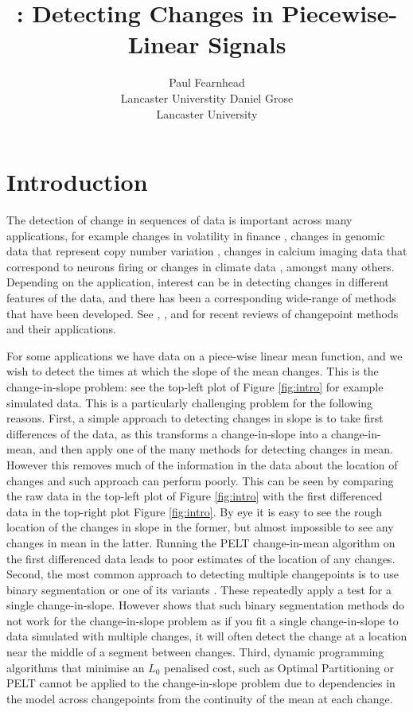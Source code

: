 \documentclass[article]{jss}
\author{Paul Fearnhead\\Lancaster Universtity \And 
        Daniel Grose\\Lancaster University}
\title{\pkg{cpop}: Detecting Changes in Piecewise-Linear Signals}
\begin{document}

\section[Introduction]{Introduction}

The detection of change in sequences of data is important across many applications, for example changes in volatility in finance \citep{andreou2002detecting}, changes in genomic data that represent copy number variation \citep{niu2012screening}, changes in calcium imaging data that correspond to neurons firing \citep{jewell2020fast} or changes in climate data \citep{reeves2007review}, amongst many others.  Depending on the application, interest can be in detecting changes in different features of the data, and there has been a corresponding wide-range of methods that have been developed. See \cite{aminikhanghahi2017survey}, \cite{truong2020selective}, \cite{fearnhead2020relating} and \cite{shi2022comparison} for recent reviews of changepoint methods and their applications.

For some applications we have data on a piece-wise linear mean function, and we wish to detect the times at which the slope of the mean changes. This is the change-in-slope problem: see the top-left plot of Figure \ref{fig:intro} for example simulated data.  This is a particularly challenging problem for the following reasons. First, a simple approach to detecting changes in slope is to take first differences of the data, as this transforms a change-in-slope into a change-in-mean, and then apply one of the many methods for detecting changes in mean. However this removes much of the information in the data about the location of changes and such approach can perform poorly. This can be seen by comparing the raw data in the top-left plot of Figure \ref{fig:intro} with the first differenced data in the top-right plot Figure \ref{fig:intro}. By eye it is easy to see the rough location of the changes in slope in the former, but almost impossible to see any changes in mean in the latter. Running the PELT change-in-mean algorithm \cite{killick2012optimal} on the first differenced data leads to poor estimates of the location of any changes. Second, the most common approach to detecting multiple changepoints is to use binary segmentation \citep{scott1974cluster} or one of its variants \citep{fryzlewicz2014wild,kovacs2020seeded}. These repeatedly apply a test for a single change-in-slope. However \cite{baranowski2016narrowest} shows that such binary segmentation methods do not work for the change-in-slope problem as if you fit a single change-in-slope to data simulated with multiple changes, it will often detect the change at a location near the middle of a segment between changes. Third, dynamic programming algorithms that minimise an $L_0$ penalised cost, such as Optimal Partitioning \citep{jackson2005algorithm} or PELT \citep{killick2012optimal} cannot be applied to the change-in-slope problem due to dependencies in the model across changepoints from the continuity of the mean at each change. 
\end{document}
